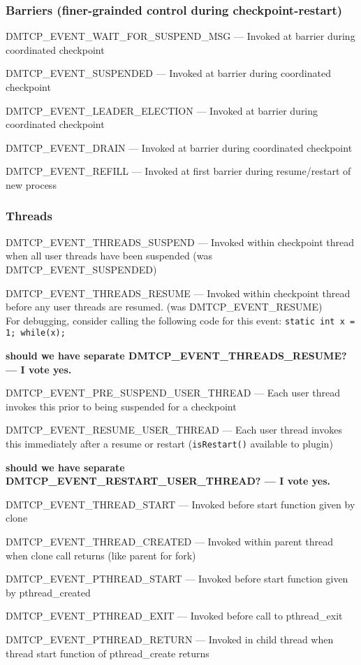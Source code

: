 \documentclass{article}
\begin{document}
\subsubsection*{Barriers (finer-grainded control during checkpoint-restart)}
\begin{list}{}{\leftmargin=3em \itemindent=-2em}
\item
  DMTCP\_EVENT\_WAIT\_FOR\_SUSPEND\_MSG --- Invoked at barrier during
coordinated checkpoint
\item
  DMTCP\_EVENT\_SUSPENDED --- Invoked at barrier during coordinated checkpoint
\item
  DMTCP\_EVENT\_LEADER\_ELECTION --- Invoked at barrier during coordinated checkpoint
\item
  DMTCP\_EVENT\_DRAIN --- Invoked at barrier during coordinated checkpoint
\item
  DMTCP\_EVENT\_REFILL --- Invoked at first barrier during resume/restart of new process
\end{list}

\subsubsection*{Threads}
\begin{list}{}{\leftmargin=3em \itemindent=-2em}
\item
  DMTCP\_EVENT\_THREADS\_SUSPEND --- Invoked within checkpoint thread
	when all user threads have been suspended
	(was DMTCP\_EVENT\_SUSPENDED)
\item
  DMTCP\_EVENT\_THREADS\_RESUME --- Invoked within checkpoint thread before
	any user threads are resumed.  (was DMTCP\_EVENT\_RESUME) \\
	For debugging, consider calling the following code for this
        event:  {\tt static int x = 1; while(x);}  
\item
  {\bf should we have separate DMTCP\_EVENT\_THREADS\_RESUME?  --- I vote yes.}
\item
  DMTCP\_EVENT\_PRE\_SUSPEND\_USER\_THREAD --- Each user thread invokes this prior
	to being suspended for a checkpoint
\item
  DMTCP\_EVENT\_RESUME\_USER\_THREAD --- Each user thread invokes this immediately
	after a resume or restart ({\tt isRestart()} available to plugin)
\item
  {\bf should we have separate DMTCP\_EVENT\_RESTART\_USER\_THREAD?  --- I vote yes.}
\item
  DMTCP\_EVENT\_THREAD\_START --- Invoked before start function given by clone
\item
  DMTCP\_EVENT\_THREAD\_CREATED --- Invoked within parent thread when clone call returns  (like parent for fork)
\item
  DMTCP\_EVENT\_PTHREAD\_START --- Invoked before start function given by pthread\_created
\item
  DMTCP\_EVENT\_PTHREAD\_EXIT --- Invoked before call to pthread\_exit
\item
  DMTCP\_EVENT\_PTHREAD\_RETURN --- Invoked in child thread when thread start function of pthread\_create returns
\item
\end{list}
\end{document}
